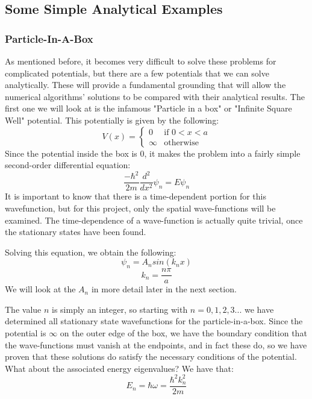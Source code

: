 \documentclass[11pt]{article} %
\begin{document}
\subsection{Some Simple Analytical Examples}
\subsubsection{Particle-In-A-Box}
As mentioned before, it becomes very difficult to solve these problems for complicated potentials, but there are a few potentials that we can solve analytically. These will provide a fundamental grounding that will allow the numerical algorithms' solutions to be compared with their analytical results. The first one we will look at is the infamous "Particle in a box" or "Infinite Square Well" potential. This potentially is given by the following:
\begin{equation}
V(x) =
\begin{cases}
0 & \text{if $0 < x < a$} \\
\infty & \text{otherwise}
\end{cases}
\end{equation}
Since the potential inside the box is $0$, it makes the problem into a fairly simple second-order differential equation:
\begin{equation}
\frac{-\hbar ^2}{2m}\frac{d^2}{dx^2}\psi _n = E\psi _n
\end{equation}
It is important to know that there is a time-dependent portion for this wavefunction, but for this project, only the spatial wave-functions will be examined. The time-dependence of a wave-function is actually quite trivial, once the stationary states have been found. 
\par Solving this equation, we obtain the following:
\begin{equation}
\psi _n = A_n sin(k_nx)
\end{equation}
\begin{equation}
k_n = \frac{n\pi}{a}
\end{equation}
We will look at the $A_n$ in more detail later in the next section. 
\par The value $n$ is simply an integer, so starting with $n=0, 1, 2, 3...$ we have determined all stationary state wavefunctions for the particle-in-a-box. Since the potential is $\infty$ on the outer edge of the box, we have the boundary condition that the wave-functions must vanish at the endpoints, and in fact these do, so we have proven that these solutions do satisfy the necessary conditions of the potential.  What about the associated energy eigenvalues? We have that:
\begin{equation}
E_n = \hbar \omega = \frac{\hbar ^2 k_n^2}{2m}
\end{equation}
\end{document}

